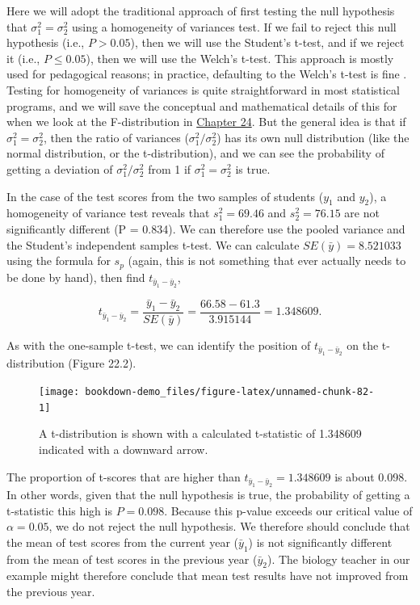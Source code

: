 \documentclass[
  openany]{scrbook}
\begin{document}
Here we will adopt the traditional approach of first testing the null hypothesis that \(\sigma^{2}_{1} = \sigma^{2}_{2}\) using a homogeneity of variances test.
If we fail to reject this null hypothesis (i.e., \(P > 0.05\)), then we will use the Student's t-test, and if we reject it (i.e., \(P \leq 0.05\)), then we will use the Welch's t-test.
This approach is mostly used for pedagogical reasons; in practice, defaulting to the Welch's t-test is fine \citep{Ruxton2006, Delacre2017}.
Testing for homogeneity of variances is quite straightforward in most statistical programs, and we will save the conceptual and mathematical details of this for when we look at the F-distribution in \protect\hyperlink{Chapter_24}{Chapter 24}.
But the general idea is that if \(\sigma^{2}_{1} = \sigma^{2}_{2}\), then the ratio of variances (\(\sigma^{2}_{1}/\sigma^{2}_{2}\)) has its own null distribution (like the normal distribution, or the t-distribution), and we can see the probability of getting a deviation of \(\sigma^{2}_{1}/\sigma^{2}_{2}\) from 1 if \(\sigma^{2}_{1} = \sigma^{2}_{2}\) is true.

In the case of the test scores from the two samples of students (\(y_{1}\) and \(y_{2}\)), a homogeneity of variance test reveals that \(s^{2}_{1} = 69.46\) and \(s^{2}_{2} = 76.15\) are not significantly different (P = 0.834).
We can therefore use the pooled variance and the Student's independent samples t-test.
We can calculate \(SE(\bar{y}) = 8.521033\) using the formula for \(s_{p}\) (again, this is not something that ever actually needs to be done by hand), then find \(t_{\bar{y}_{1} - \bar{y}_{2}}\),

\[t_{\bar{y}_{1} - \bar{y}_{2}} = \frac{\bar{y}_{1} - \bar{y}_{2}}{SE(\bar{y})} = \frac{66.58 - 61.3}{3.915144} = 1.348609.\]

As with the one-sample t-test, we can identify the position of \(t_{\bar{y}_{1} - \bar{y}_{2}}\) on the t-distribution (Figure 22.2).

\begin{figure}
\texttt{[image: bookdown-demo\_files/figure-latex/unnamed-chunk-82-1]} \caption{A t-distribution is shown with a calculated t-statistic of 1.348609 indicated with a downward arrow.}\label{fig:unnamed-chunk-82}
\end{figure}

The proportion of t-scores that are higher than \(t_{\bar{y}_{1} - \bar{y}_{2}} = 1.348609\) is about 0.098.
In other words, given that the null hypothesis is true, the probability of getting a t-statistic this high is \(P = 0.098\).
Because this p-value exceeds our critical value of \(\alpha = 0.05\), we do not reject the null hypothesis.
We therefore should conclude that the mean of test scores from the current year (\(\bar{y}_{1}\)) is not significantly different from the mean of test scores in the previous year (\(\bar{y}_{2}\)).
The biology teacher in our example might therefore conclude that mean test results have not improved from the previous year.
\end{document}
